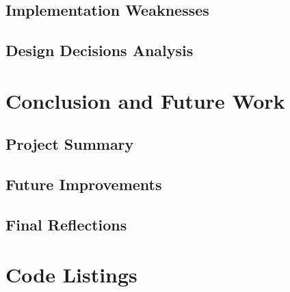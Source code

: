 \documentclass[12pt,a4paper]{report}
\begin{document}
\section{Implementation Weaknesses}

\section{Design Decisions Analysis}

\chapter{Conclusion and Future Work}
\section{Project Summary}

\section{Future Improvements}

\section{Final Reflections}

\appendix
\chapter{Code Listings}
\end{document}
